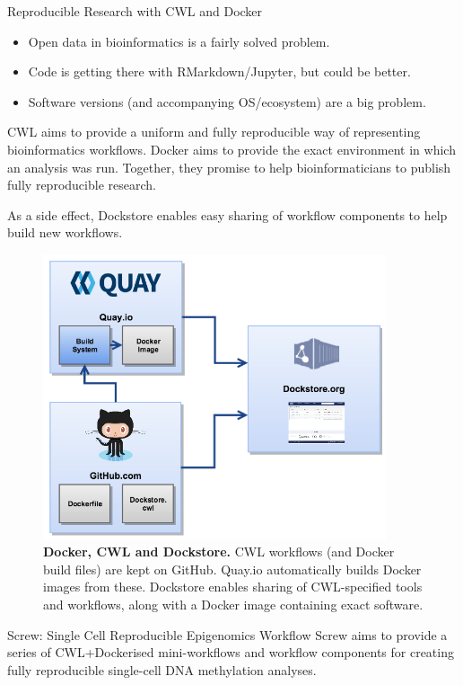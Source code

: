 \documentclass{beamer}
\begin{document}
\begin{frame}
\begin{columns}[t]
\begin{column}{.32\textwidth}
\begin{block}{Reproducible Research with CWL and Docker}
\begin{itemize}
\item Open data in bioinformatics is a fairly solved problem.
\item Code is getting there with RMarkdown/Jupyter, but could be better.
\item Software versions (and accompanying OS/ecosystem) are a big problem.
\end{itemize}
CWL aims to provide a uniform and fully reproducible way of representing bioinformatics workflows. Docker aims to provide the exact environment in which an analysis was run. Together, they promise to help bioinformaticians to publish fully reproducible research.

As a side effect, Dockstore enables easy sharing of workflow components to help build new workflows. 
\begin{figure}
\begin{center}
\includegraphics[width=0.9\textwidth]{figures/dockstore_logos.png}
\end{center}
\caption{\textbf{Docker, CWL and Dockstore.} CWL workflows (and Docker build files) are kept on GitHub. Quay.io automatically builds Docker images from these. Dockstore enables sharing of CWL-specified tools and workflows, along with a Docker image containing exact software.}
\end{figure}
\end{block}


\begin{block}{Screw: Single Cell Reproducible Epigenomics Workflow}
Screw aims to provide a series of CWL+Dockerised mini-workflows and workflow components for creating fully reproducible single-cell DNA methylation analyses.


\end{block}
\end{column}
\end{columns}
\end{frame}
\end{document}
